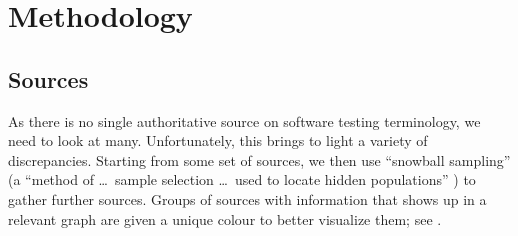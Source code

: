 \section{Methodology}
\label{method}

\subsection{Sources}
\label{sources}
As there is no single authoritative source on software testing terminology,
we need to look at many. Unfortunately, this brings to light a variety of
discrepancies. Starting from some set of sources, we then use
``snowball sampling'' (a ``method of \dots\ sample selection \dots\ used to
locate hidden populations'' \citep{Johnson2014})
to gather further sources. Groups of sources with
information that shows up in a relevant graph are given a unique colour to
better visualize them; see .

